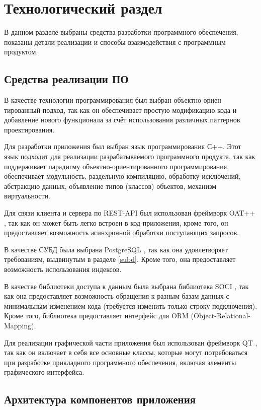 \chapter{Технологический раздел}

В данном разделе выбраны средства разработки программного обеспечения, показаны детали реализации и способы взаимодействия с программным продуктом.

\section{Средства реализации ПО}
В качестве технологии программирования был выбран объектно-ориен-тированный подход, так как он обеспечивает простую модификацию кода и добавление нового функционала за счёт использования различных паттернов проектирования. 

Для разработки приложения был выбран язык программирования С++. Этот язык подходит для реализации разрабатываемого программного продукта, так как поддерживает парадигму объектно-ориентированного программирования, обеспечивает модульность, раздельную компиляцию, обработку исключений, абстракцию данных, объявление типов (классов) объектов, механизм виртуальности. 

Для связи клиента и сервера по REST-API был использован фреймворк OAT++ \cite{bib:3}, так как он может быть легко встроен в код приложения, кроме того, он предоставляет возможность асинхронной обработки поступающих запросов.

В качестве СУБД была выбрана PostgreSQL \cite{bib:4}, так как она удовлетворяет требованиям, выдвинутым в разделе \ref{subd}. Кроме того, она предоставляет возможность использования индексов. 

В качестве библиотеки доступа к данным была выбрана библиотека SOCI \cite{bib:5}, так как она предоставляет возможность обращения к разным базам данных с минимальным изменением кода (требуется изменить только строку подключения). Кроме того, библиотека предоставляет интерфейс для ORM (Object-Relational-Mapping).

Для реализации графической части приложения был использован фреймворк QT \cite{bib:6}, так как он включает в себя все основные классы, которые могут потребоваться при разработке прикладного программного обеспечения, включая элементы графического интерфейса. 

\section{Архитектура компонентов приложения}
